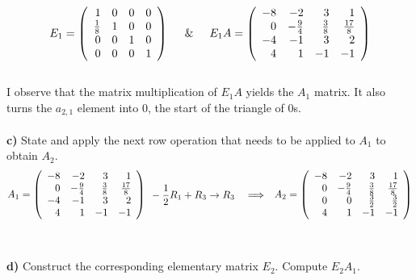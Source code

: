 \documentclass{article}
\begin{document}
\[
E_1 = 
\left(
\begin{array}{rrrr}
1 & 0 & 0 & 0 \\
\frac{1}{8} & 1 & 0 & 0 \\
0 & 0 & 1 & 0 \\
0 & 0 & 0 & 1 
\end{array}
\right)
\hspace{0.5cm} \& \hspace{0.5cm}
E_1A =
\left(
\begin{array}{rrrr}
-8 & -2 & 3 & 1 \\
0 & -\frac{9}{4} & \frac{3}{8} & \frac{17}{8} \\
-4 & -1 & 3 & 2 \\
4 & 1 & -1 & -1 
\end{array}
\right)
\]\\
I observe that the matrix multiplication of $E_1A$ yields the $A_1$ matrix. It also turns the $a_{2,1}$ element into 0, the start of the triangle of 0s.\\\\

{\bf c)} State and apply the next row operation that needs to be applied to $A_1$
to obtain $A_2$. \\

\[
A_1 =
\left(
\begin{array}{rrrr}
-8 & -2 & 3 & 1 \\
0 & -\frac{9}{4} & \frac{3}{8} & \frac{17}{8} \\
-4 & -1 & 3 & 2 \\
4 & 1 & -1 & -1 
\end{array}
\right)
\hspace{0.1cm}
\begin{aligned}
& -\frac{1}{2}R_1 + R_3 \rightarrow R_3 \quad\Longrightarrow
\end{aligned}
A_2 =
\left(
\begin{array}{rrrr}
-8 & -2 & 3 & 1 \\
0 & -\frac{9}{4} & \frac{3}{8} & \frac{17}{8} \\
0 & 0 & \frac{3}{2} & \frac{3}{2} \\
4 & 1 & -1 & -1 
\end{array}
\right)
\]\\\\

{\bf d)} Construct the corresponding elementary matrix $E_2$. Compute $E_2 A_1$. \\
\end{document}

